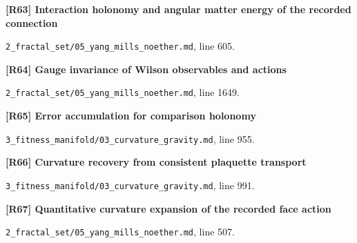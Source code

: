 \documentclass[11pt,a4paper]{article}
\begin{document}
\par\medskip\noindent\begin{minipage}{\linewidth}\textbf{[R63] Interaction holonomy and angular matter energy of the recorded connection}\label{src:prop-ym-recorded-interaction-sector}\par
{\small\texttt{}\par
\nolinkurl{2_fractal_set/05_yang_mills_noether.md}, line 605.\par}
\end{minipage}\par

\par\medskip\noindent\begin{minipage}{\linewidth}\textbf{[R64] Gauge invariance of Wilson observables and actions}\label{src:thm-wilson-action-gauge-invariance}\par
{\small\texttt{}\par
\nolinkurl{2_fractal_set/05_yang_mills_noether.md}, line 1649.\par}
\end{minipage}\par

\par\medskip\noindent\begin{minipage}{\linewidth}\textbf{[R65] Error accumulation for comparison holonomy}\label{src:lem-regge-holonomy-approx}\par
{\small\texttt{}\par
\nolinkurl{3_fitness_manifold/03_curvature_gravity.md}, line 955.\par}
\end{minipage}\par

\par\medskip\noindent\begin{minipage}{\linewidth}\textbf{[R66] Curvature recovery from consistent plaquette transport}\label{src:thm-riemann-scutoid}\par
{\small\texttt{}\par
\nolinkurl{3_fitness_manifold/03_curvature_gravity.md}, line 991.\par}
\end{minipage}\par

\par\medskip\noindent\begin{minipage}{\linewidth}\textbf{[R67] Quantitative curvature expansion of the recorded face action}\label{src:lem-ym-recorded-face-action-remainder}\par
{\small\texttt{}\par
\nolinkurl{2_fractal_set/05_yang_mills_noether.md}, line 507.\par}
\end{minipage}\par
\end{document}
